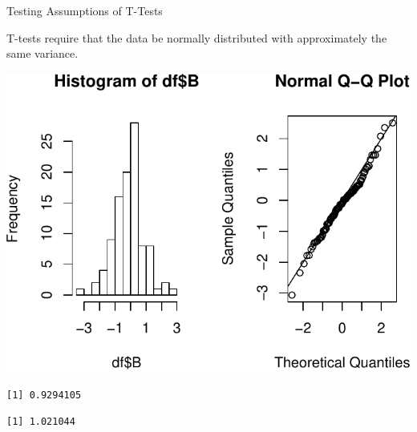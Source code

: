 \begin{frame}[fragile]{Testing Assumptions of T-Tests}

T-tests require that the data be normally distributed with approximately
the same variance.

\begin{Shaded}
\begin{Highlighting}[]
\NormalTok{(} \NormalTok{(}\NormalTok{,}\NormalTok{))}
\OperatorTok{$}
\OperatorTok{$}
\NormalTok{(}\NormalTok{, }\NormalTok{)}
\end{Highlighting}
\end{Shaded}

\includegraphics{04_BasicAnalyses_files/figure-beamer/unnamed-chunk-5-1.pdf}

\begin{Shaded}
\begin{Highlighting}[]
\OperatorTok{$}
\end{Highlighting}
\end{Shaded}

\begin{verbatim}
[1] 0.9294105
\end{verbatim}

\begin{Shaded}
\begin{Highlighting}[]
\OperatorTok{$}
\end{Highlighting}
\end{Shaded}

\begin{verbatim}
[1] 1.021044
\end{verbatim}

\end{frame}

